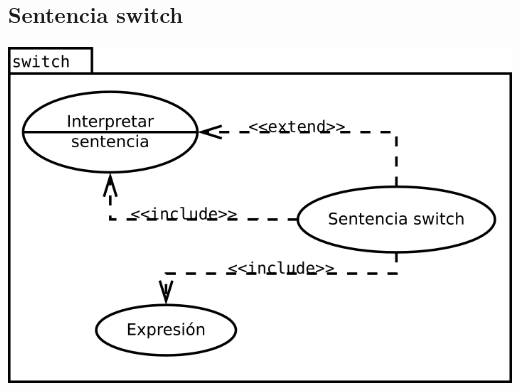 \subsection {Sentencia switch}
\begin{center}
\includegraphics[scale=0.4]{switch.png} \\
\end{center}
